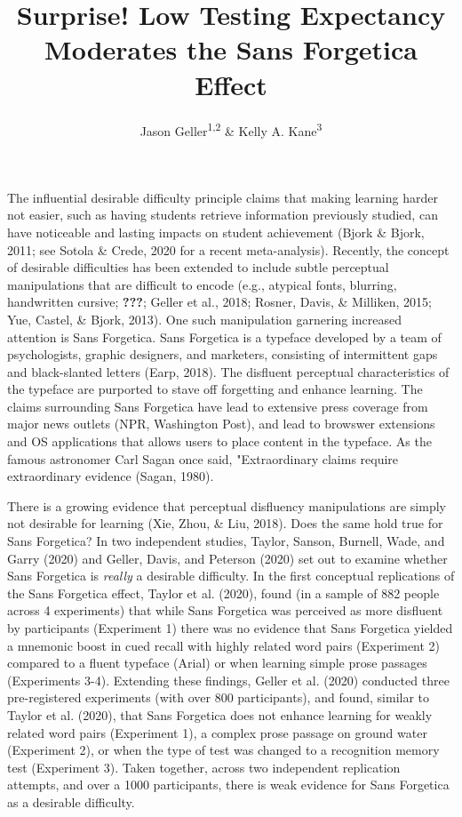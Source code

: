 \documentclass[
  english,
  jou]{apa6}
\title{Surprise! Low Testing Expectancy Moderates the Sans Forgetica Effect}
\author{Jason Geller\textsuperscript{1,2} \& Kelly A. Kane\textsuperscript{3}}
\date{}
\affiliation{\vspace{0.5cm}\textsuperscript{1} University of Iowa\\\textsuperscript{2} Rutgers University Center for Cognitive Science\\\textsuperscript{3} Glenville State College}
\begin{document}
\maketitle

The influential desirable difficulty principle claims that making learning harder not easier, such as having students retrieve information previously studied, can have noticeable and lasting impacts on student achievement (Bjork \& Bjork, 2011; see Sotola \& Crede, 2020 for a recent meta-analysis). Recently, the concept of desirable difficulties has been extended to include subtle perceptual manipulations that are difficult to encode (e.g., atypical fonts, blurring, handwritten cursive; {\textbf{???}}; Geller et al., 2018; Rosner, Davis, \& Milliken, 2015; Yue, Castel, \& Bjork, 2013). One such manipulation garnering increased attention is Sans Forgetica. Sans Forgetica is a typeface developed by a team of psychologists, graphic designers, and marketers, consisting of intermittent gaps and black-slanted letters (Earp, 2018). The disfluent perceptual characteristics of the typeface are purported to stave off forgetting and enhance learning. The claims surrounding Sans Forgetica have lead to extensive press coverage from major news outlets (NPR, Washington Post), and lead to browswer extensions and OS applications that allows users to place content in the typeface. As the famous astronomer Carl Sagan once said, "Extraordinary claims require extraordinary evidence (Sagan, 1980).

There is a growing evidence that perceptual disfluency manipulations are simply not desirable for learning (Xie, Zhou, \& Liu, 2018). Does the same hold true for Sans Forgetica? In two independent studies, Taylor, Sanson, Burnell, Wade, and Garry (2020) and Geller, Davis, and Peterson (2020) set out to examine whether Sans Forgetica is \emph{really} a desirable difficulty. In the first conceptual replications of the Sans Forgetica effect, Taylor et al. (2020), found (in a sample of 882 people across 4 experiments) that while Sans Forgetica was perceived as more disfluent by participants (Experiment 1) there was no evidence that Sans Forgetica yielded a mnemonic boost in cued recall with highly related word pairs (Experiment 2) compared to a fluent typeface (Arial) or when learning simple prose passages (Experiments 3-4). Extending these findings, Geller et al. (2020) conducted three pre-registered experiments (with over 800 participants), and found, similar to Taylor et al. (2020), that Sans Forgetica does not enhance learning for weakly related word pairs (Experiment 1), a complex prose passage on ground water (Experiment 2), or when the type of test was changed to a recognition memory test (Experiment 3). Taken together, across two independent replication attempts, and over a 1000 participants, there is weak evidence for Sans Forgetica as a desirable difficulty.
\end{document}
